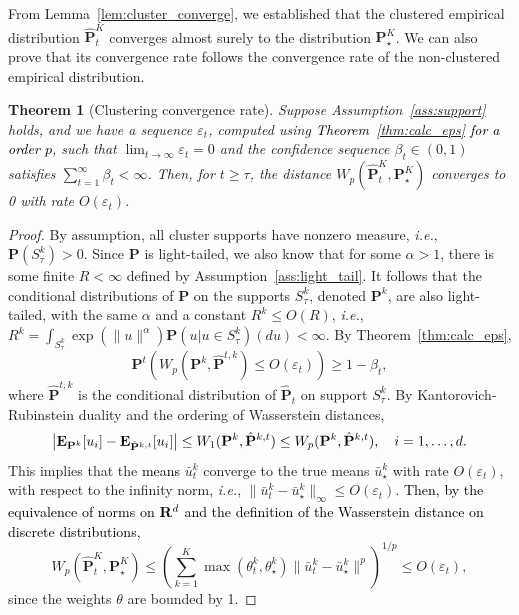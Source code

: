 \documentclass[12pt]{article}
\newcommand{\ie}{{\it i.e.}}
\newcommand{\reals}{{\bf R}}
\newcommand{\prob}{{\mathbf P}}
\newcommand{\Expect}{{\mbox{\bf E}}}
\newcommand{\epsnom}{\varepsilon}
\newcommand{\barp}{p}
\newtheorem{theorem}{Theorem}[section]  %
\newcommand{\RC}[1]{\textcolor{black}{#1}}
\newcommand{\RC}[1]{\textcolor{blue}{#1}}
\begin{document}
From Lemma~\ref{lem:cluster_converge}, we established that the clustered empirical distribution $\hat{\prob}^K_t$ converges almost surely to the distribution $\prob^K_\star$. We can also prove that its convergence rate follows the convergence rate of the non-clustered empirical distribution. 
\begin{theorem}[Clustering convergence rate]
\label{lem:conditional_Conv}
Suppose Assumption~\ref{ass:support} holds, and we have a sequence $\epsnom_t$, computed using \RC{Theorem~\ref{thm:calc_eps} for a order $\barp$}, such that $\lim_{t \rightarrow \infty} \epsnom_t = 0$ and the confidence sequence $\beta_t \in (0,1)$ satisfies $\sum_{t=1}^\infty {\beta_t < \infty}$. Then, for $t \geq \tau$, the distance $W_{\barp}(\hat{\prob}^K_t,\prob^K_\star)$ converges to 0 with rate $O(\epsnom_t)$.
\end{theorem}
\begin{proof}
    By assumption, all cluster supports have nonzero measure, \ie, $\prob(S^k_\tau) > 0$. 
    Since $\prob$ is light-tailed, we also know that for some $\alpha > 1$, there is some finite $R <\infty$ defined by Assumption~\ref{ass:light_tail}.
    It follows that the conditional distributions of $\prob$ on the supports $S^k_\tau$, denoted $\prob^k$, are also light-tailed, with the same $\alpha$ and a constant $R^k \leq O(R)$, \ie,
    $R^k = \int_{S_\tau^k} \exp(\|u\|^{\alpha})\prob(u|u\in S^k_\tau)(du) < \infty.$
    By Theorem~\ref{thm:calc_eps},
    $$\prob^{t}(W_{\barp}(\prob^k,\hat{\prob}^{t,k})\leq O(\epsnom_t)) \geq 1-\beta_t,$$
    where $\hat{\prob}^{t,k}$ is the conditional distribution of $\hat{\prob}_t$ on support $S^k_\tau$.
    By Kantorovich-Rubinstein duality and the ordering of Wasserstein distances, 
    $$\left|\Expect_{\prob^k}[u_i] - \Expect_{\hat{\prob}^{k,t}}[u_i] \right| \leq W_1(\prob^k,\hat{\prob}^{k,t}) \leq W_{\barp}(\prob^k,\hat{\prob}^{k,t}), \quad i =1,\dots,d.$$
    This implies that the \RC{means} $\bar{u}^k_t$ converge to the true means $\bar{u}^k_\star$ with rate $O(\epsnom_t)$, with respect to the infinity norm, \ie, 
    $\| \bar{u}^k_t - \bar{u}^k_\star\|_\infty \leq O(\epsnom_t).$
    \RC{Then, by the equivalence of norms on $\reals^d$ and the definition of the Wasserstein distance on discrete distributions,}
    $$W_{\barp}(\hat{\prob}^K_t,\prob^K_\star) \leq \left(\sum_{k=1}^K\max(\theta^k_t,\theta^k_\star) \| \bar{u}^k_t - \bar{u}^k_\star\|^{\barp}\right)^{1/{\barp}} \leq O(\epsnom_t),$$
    since the weights $\theta$ are bounded by 1. 
\end{proof}
\end{document}
